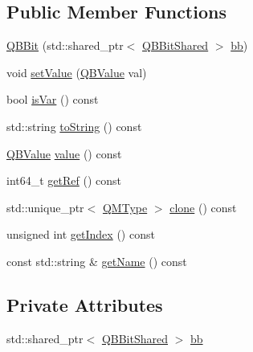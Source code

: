 \subsection*{Public Member Functions}
\begin{DoxyCompactItemize}
\item 
\hyperlink{classQuickMath_1_1QBBit_a5e11e1f0aa39500e8a9e6a2c69cddfa4}{Q\+B\+Bit} (std\+::shared\+\_\+ptr$<$ \hyperlink{classQuickMath_1_1QBBitShared}{Q\+B\+Bit\+Shared} $>$ \hyperlink{classQuickMath_1_1QBBit_ac2d748c7aa8ad849b2bdd5bc98d24caa}{bb})
\item 
void \hyperlink{classQuickMath_1_1QBBit_a4ec9d377770f994b72a3e23aee6a1314}{set\+Value} (\hyperlink{namespaceQuickMath_aec13b08c42d9f8e688241623c8b379a0}{Q\+B\+Value} val)
\item 
bool \hyperlink{classQuickMath_1_1QBBit_a6f570086177786f5bf8191505f9216c1}{is\+Var} () const 
\item 
std\+::string \hyperlink{classQuickMath_1_1QBBit_acf69bfd78922571f1f0ac146c4eed56f}{to\+String} () const 
\item 
\hyperlink{namespaceQuickMath_aec13b08c42d9f8e688241623c8b379a0}{Q\+B\+Value} \hyperlink{classQuickMath_1_1QBBit_add83657ec02a247eeb3883f8140d3223}{value} () const 
\item 
int64\+\_\+t \hyperlink{classQuickMath_1_1QBBit_a436915618ae2bc50324d5783b2d61f9c}{get\+Ref} () const 
\item 
std\+::unique\+\_\+ptr$<$ \hyperlink{classQuickMath_1_1QMType}{Q\+M\+Type} $>$ \hyperlink{classQuickMath_1_1QBBit_a5104a43946ee33625bc7b7ad02850d7a}{clone} () const 
\item 
unsigned int \hyperlink{classQuickMath_1_1QBBit_a14a19b5e9f00aa884eee8f54d111ec7a}{get\+Index} () const 
\item 
const std\+::string \& \hyperlink{classQuickMath_1_1QBBit_a7a314546144d02b0053374405d24d2b6}{get\+Name} () const 
\end{DoxyCompactItemize}
\subsection*{Private Attributes}
\begin{DoxyCompactItemize}
\item 
std\+::shared\+\_\+ptr$<$ \hyperlink{classQuickMath_1_1QBBitShared}{Q\+B\+Bit\+Shared} $>$ \hyperlink{classQuickMath_1_1QBBit_ac2d748c7aa8ad849b2bdd5bc98d24caa}{bb}
\end{DoxyCompactItemize}


